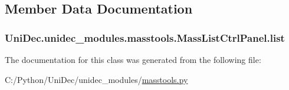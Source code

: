 \subsection{Member Data Documentation}
\hypertarget{class_uni_dec_1_1unidec__modules_1_1masstools_1_1_mass_list_ctrl_panel_a91b70ed2a3410edd2817f377b9d4c0dc}{}
\subsubsection[{list}]{\setlength{\rightskip}{0pt plus 5cm}Uni\+Dec.\+unidec\+\_\+modules.\+masstools.\+Mass\+List\+Ctrl\+Panel.\+list}\label{class_uni_dec_1_1unidec__modules_1_1masstools_1_1_mass_list_ctrl_panel_a91b70ed2a3410edd2817f377b9d4c0dc}


The documentation for this class was generated from the following file\+:\begin{DoxyCompactItemize}
\item 
C\+:/\+Python/\+Uni\+Dec/unidec\+\_\+modules/\hyperlink{masstools_8py}{masstools.\+py}\end{DoxyCompactItemize}

